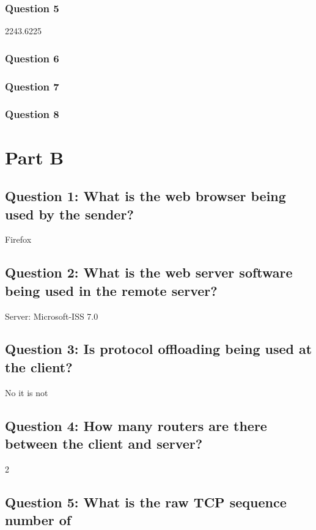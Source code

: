 \documentclass[11pt, oneside, a4paper]{article}
\begin{document}
\subsubsection*{Question 5}
2243.6225

\subsubsection*{Question 6}

\subsubsection*{Question 7}

\subsubsection*{Question 8}


\newpage
\section*{Part B}

\subsection*{Question 1: What is the web browser being used by the sender?}
Firefox

\subsection*{Question 2: What is the web server software being used in the remote server?}
Server: Microsoft-ISS 7.0

\subsection*{Question 3: Is protocol offloading being used at the client?}
No it is not

\subsection*{Question 4: How many routers are there between the client and server?}
2

\subsection*{Question 5: What is the raw TCP sequence number of}
\end{document}
